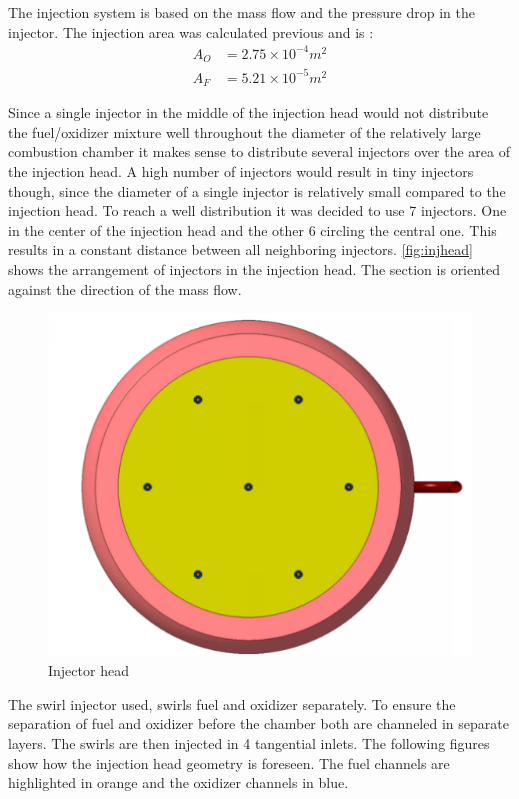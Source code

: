 The injection system is based on the mass flow and the pressure drop in the injector. The injection area was calculated previous and is :
\begin{align}
A_O & = 2.75\times 10^{-4} m^2\\
A_{F} &= 5.21\times 10^{-5} m^2
\end{align}

Since a single injector in the middle of the injection head would not distribute the fuel/oxidizer mixture well throughout the diameter of the relatively large combustion chamber it makes sense to distribute several injectors over the area of the injection head. A high number of injectors would result in tiny injectors though, since the diameter of a single injector is relatively small compared to the injection head. To reach a well distribution it was decided to use 7 injectors. One in the center of the injection head and the other 6 circling the central one. This results in a constant distance between all neighboring injectors. \autoref{fig:injhead} shows the arrangement of injectors in the injection head. The section is oriented against the direction of the mass flow.

\begin{figure}[H]
	\centering\includegraphics[width=0.8\linewidth]{injhead}
	\caption{Injector head}\label{fig:injhead}
\end{figure}

The swirl injector used, swirls fuel and oxidizer separately. To ensure the separation of fuel and oxidizer before the chamber both are channeled in separate layers. The swirls are then injected in 4 tangential inlets. The following figures show how the injection head geometry is foreseen. The fuel channels are highlighted in orange and the oxidizer channels in blue.

